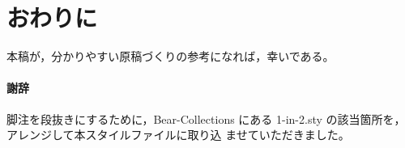 \documentclass[10pt,twocolumn]{jarticle} %
\begin{document}
\section{おわりに}

本稿が，分かりやすい原稿づくりの参考になれば，幸いである。

\paragraph{謝辞}

脚注を段抜きにするために，Bear-Collections \cite{bear}
にある 1-in-2.sty の該当箇所を，アレンジして本スタイルファイルに取り込
ませていただきました。





\end{document}
